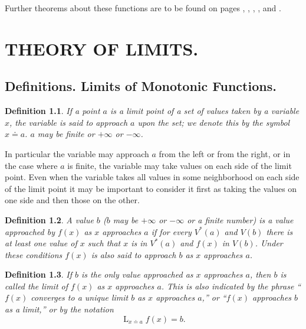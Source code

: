 \documentclass[a4paper,12pt]{book}[2004/02/16]
\providecommand{\colorbox}[2]{#2}
\newcommand{\correction}[2]{\colorbox{corr}{#1}}
\providecommand{\hypertarget}[2]{#2}
\theoremstyle{ilemma}
\theoremstyle{itheorem}
\theoremstyle{iother}
\theoremstyle{icorollary}
\theoremstyle{numcorollary}
\theoremstyle{idefinition}
\newtheorem*{definition}{Definition}
\begin{document}
Further theorems about these functions are to be found on pages
\pageref{logp64}, \pageref{logp81}, \pageref{s4p97}, \pageref{p123},
and \pageref{t101p160}.



\chapter{THEORY OF LIMITS.}\hypertarget{chapIV}{}%

\section{Definitions. Limits of Monotonic Functions.}\hypertarget{chIVsec1}{}%

\begin{definition}
If a point $a$ is a limit point of a set of values taken by a variable
$x$, the variable is said \emph{to approach $a$ upon} the set; we
denote this by the symbol $x\doteq a$. $a$ may be finite or $+\infty$
or $-\infty$.
\end{definition}

In particular the variable may approach $a$ from the left or from the
right, or in the case where $a$ is finite, the variable may take
values on each side of the limit point. Even when the variable takes
all values in some neighborhood on each side of the limit point it may
be important to consider it first as taking the values on one side and
then those on the other.

\begin{definition}
A value $b$ ($b$ may be $+\infty$ or $-\infty$ or a finite number) is
a \emph{value approached} by $f(x)$ as $x$ approaches $a$ if for every
$V^*(a)$ and $V(b)$ there is at least one value of $x$ such that $x$
is in $V^*(a)$ and $f(x)$ in $V(b)$. Under these conditions $f(x)$ is
also said to approach $b$ as $x$ approaches $a$.
\end{definition}

\begin{definition}
If $b$ is the only value approached as $x$ approaches $a$, then $b$ is
called \emph{the limit of $f(x)$} as $x$ approaches $a$.  This is also
indicated by the phrase ``\emph{$f(x)$ converges to a unique limit
$b$} as $x$ approaches $a$,'' or ``\emph{$f(x)$ approaches $b$ as a
limit},'' or by the notation
\[
  \mathop{L}_{\text{\correction{$x\doteq a$}{$x=a$}}} f(x)=b.
\]
\end{definition}
\end{document}
